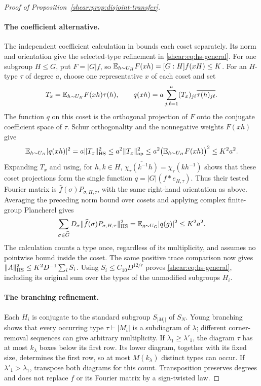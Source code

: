 \begin{proof}[Proof of Proposition~\ref{shear:prop:disjoint-transfer}]
\paragraph{The coefficient alternative.}
The independent coefficient calculation in
\cite[Lemma~]{partial-fourier}
bounds each coset separately. Its norm and orientation give the
selected-type refinement in \eqref{shear:eq:hs-general}.
For one subgroup \(H\le G\), put \(F=|G|f\), so
\(\mathbb E_{h\sim U_H}F(xh)=[G:H]f(xH)\le K\).
For an \(H\)-type \(\tau\) of degree \(a\), choose one representative
\(x\) of each coset and set
\[
 T_x=\mathbb E_{h\sim U_H}F(xh)\tau(h),\qquad
 q(xh)=a\sum_{j,\ell=1}^a(T_x)_{j\ell}\overline{\tau(h)_{j\ell}}.
\]
The function \(q\) on this coset is the orthogonal projection of
\(F\) onto the conjugate coefficient space of \(\tau\). Schur
orthogonality and the nonnegative weights \(F(xh)\) give
\begin{equation}
 \mathbb E_{h\sim U_H}|q(xh)|^2
 =a\|T_x\|_{\mathrm{HS}}^2
 \le a^2\|T_x\|_{\mathrm{op}}^2
 \le a^2\bigl(\mathbb E_{h\sim U_H}F(xh)\bigr)^2
 \le K^2a^2.
 \label{shear:eq:coset-coefficient-norm}
\end{equation}
Expanding \(T_x\) and using, for \(h,k\in H\),
\(\overline{\chi_\tau(k^{-1}h)}=\chi_\tau(kh^{-1})\)
shows that these coset projections form the single function
\(q=|G|(f*e_{H,\tau})\). Thus their tested Fourier matrix is
\(\widehat f(\sigma)P_{\sigma,H,\tau}\), with the same right-hand
orientation as above. Averaging the preceding norm bound over cosets
and applying complex finite-group Plancherel gives
\begin{equation}
 \sum_{\sigma\in\widehat G}D_\sigma
       \|\widehat f(\sigma)P_{\sigma,H,\tau}\|_{\mathrm{HS}}^2
 =\mathbb E_{g\sim U_G}|q(g)|^2\le K^2a^2.
 \label{shear:eq:coefficient-one-type}
\end{equation}
The calculation counts a type once, regardless of its multiplicity,
and assumes no pointwise bound inside the coset. The same positive
trace comparison now gives
\(\|A\|_{\mathrm{HS}}^2\le K^2D^{-1}\sum_iS_i\).
Using \(S_i\le C_{10}D^{12/r}\) proves
\eqref{shear:eq:hs-general}, including its original sum over the
types of the unmodified subgroups \(H_i\).

\paragraph{The branching refinement.}
Each \(H_i\) is conjugate to the standard subgroup \(S_{|M_i|}\)
of \(S_N\). Young branching
\cite[Theorem~9.2]{James1978} shows that every occurring type
\(\tau\vdash |M_i|\) is a subdiagram of \(\lambda\); different
corner-removal sequences can give arbitrary multiplicity.
If \(\lambda_1\ge\lambda'_1\), the diagram \(\tau\) has at most
\(k_\lambda\) boxes below its first row. Its lower diagram, together
with its fixed size, determines the first row, so at most
\(M(k_\lambda)\) distinct types can occur. If
\(\lambda'_1>\lambda_1\), transpose both diagrams for this count.
Transposition preserves degrees and does not replace \(f\) or its
Fourier matrix by a sign-twisted law.


\end{proof}
